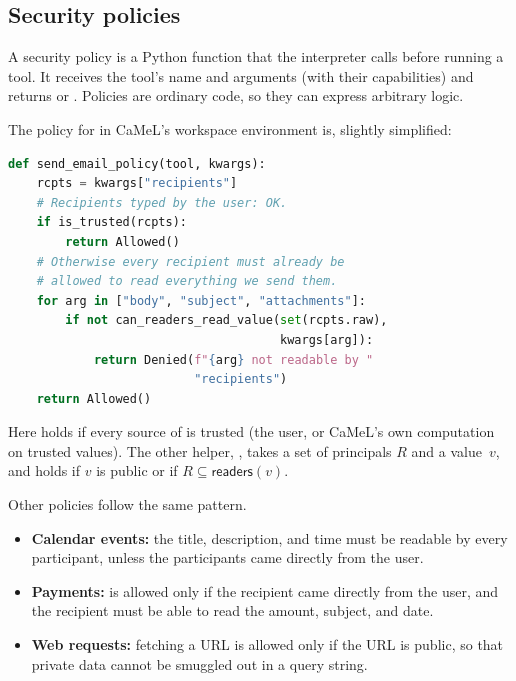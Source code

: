 \subsection{Security policies}
\label{sec:camel:policies}

A security policy is a Python function that the interpreter calls before
running a tool.
It receives the tool's name and arguments (with their capabilities) and
returns  or .
Policies are ordinary code, so they can express arbitrary logic.

The policy for  in CaMeL's workspace environment is,
slightly simplified:
\begin{lstlisting}[language=python,style=camel]
def send_email_policy(tool, kwargs):
    rcpts = kwargs["recipients"]
    # Recipients typed by the user: OK.
    if is_trusted(rcpts):
        return Allowed()
    # Otherwise every recipient must already be
    # allowed to read everything we send them.
    for arg in ["body", "subject", "attachments"]:
        if not can_readers_read_value(set(rcpts.raw),
                                      kwargs[arg]):
            return Denied(f"{arg} not readable by "
                          "recipients")
    return Allowed()
\end{lstlisting}
Here  holds if every source of  is trusted
(the user, or CaMeL's own computation on trusted values).
The other helper,
, takes a set of principals $R$ and a
value~$v$, and holds if $v$ is public or if
$R \subseteq \mathsf{readers}(v)$.

Other policies follow the same pattern.
\begin{itemize}
\item \textbf{Calendar events:} the title, description, and time must be
  readable by every participant, unless the participants came directly
  from the user.
\item \textbf{Payments:}  is allowed only if the
  recipient came directly from the user, and the recipient must be able
  to read the amount, subject, and date.
\item \textbf{Web requests:} fetching a URL is allowed only if the URL
  is public, so that private data cannot be smuggled out in a query
  string.
\end{itemize}

